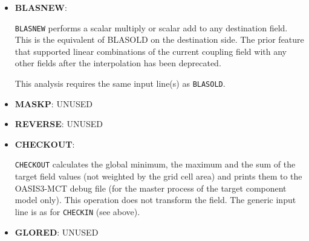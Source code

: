 \begin{itemize}
%
%

\item {\bf BLASNEW}:
 
  {\tt BLASNEW} performs a scalar multiply or scalar add to any
  destination field.  This is the equivalent of BLASOLD on the
  destination side.  The prior feature that supported linear
  combinations of the current coupling field with any other fields
  after the interpolation has been deprecated.

  This analysis requires the same input line(s) as {\tt BLASOLD}.

\item {\bf MASKP}: UNUSED

\item {\bf REVERSE}: UNUSED

\item {\bf CHECKOUT}:

  {\tt CHECKOUT} calculates the global minimum, the maximum and the
  sum of the target field values (not weighted by the grid cell area)
  and prints them to the OASIS3-MCT debug file (for the master process
  of the target component model only). This operation does not
  transform the field.  The generic input line is as for {\tt CHECKIN}
  (see above).

\item {\bf GLORED}: UNUSED

\end{itemize}


